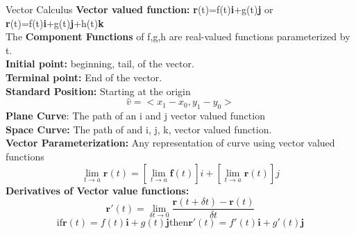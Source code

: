\documentclass[a4paper, 12pt]{article}
\begin{document}
\begin{section}{Vector Calculus}
\textbf{Vector valued function:} \textbf{r}(t)=f(t)\textbf{i}+g(t)\textbf{j} or 
\textbf{r}(t)=f(t)\textbf{i}+g(t)\textbf{j}+h(t)\textbf{k}\\
The \textbf{Component Functions} of f,g,h are real-valued functions parameterized by t.\\
\textbf{Initial point:} beginning, tail, of the vector.\\
\textbf{Terminal point:} End of the vector.\\
\textbf{Standard Position:} Starting at the origin
\begin{equation}
	\hat{v}=<x_1-x_0,y_1-y_0>
\end{equation}
\textbf{Plane Curve}: The path of an i and j vector valued function\\
\textbf{Space Curve:} The path of and i, j, k, vector valued function.\\
\textbf{Vector Parameterization:} Any representation of curve using vector valued functions
\begin{equation}
\lim\limits_{t\to a}\textbf{r}(t)=[\lim\limits_{t\to a}\textbf{f}(t)]i+
[\lim\limits_{t\to a}\textbf{r}(t)]j
\end{equation}
\textbf{Derivatives of Vector value functions:}
\begin{equation}
\textbf{r}'(t)=\lim\limits_{\delta t\to 0}\frac{\textbf{r}(t+\delta t)-\textbf{r}(t)}{\delta t}
\end{equation}
\begin{equation}
\mbox{if} \textbf{r}(t)=f(t)\textbf{i}+g(t)\textbf{j} \mbox{then}
\textbf{r}'(t)=f'(t)\textbf{i}+g'(t)\textbf{j}
\end{equation}
\end{section}
\end{document}
